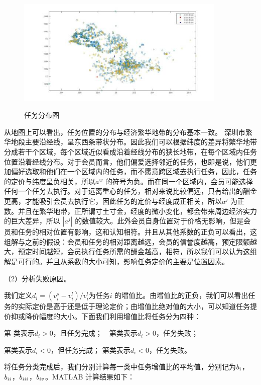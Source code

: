 \documentclass{ctexart}
\begin{document}
\begin{figure}
  \ \ \ \ \ \ \  \ \ \ \ \ \ \  \ \ \ \  \  \includegraphics[width=10cm]{5.jpg}
   \caption*{任务分布图}
  \end{figure}

 从地图上可以看出，任务位置的分布与经济繁华地带的分布基本一致。
  深圳市繁华地段主要沿经线，呈东西条带状分布。因此我们可以根据纬度的差异将繁华地带分成若干个区域，每个区域近似看成沿着经线分布的狭长地带，在每个区域内任务位置沿着经线分布。对于会员而言，他们偏爱选择邻近的任务，也即是说，他们更加偏好选取和他们在一个区域内的任务，而不愿意跨区域去执行任务，因此，任务的定价与纬度呈负相关，所以$a^{w}$ 的符号为负。而在同一个区域内，会员可能选择任何一个任务去执行。对于远离重心的任务，相对来说比较偏远，只有给出的酬金更高，才能吸引会员去执行它，因此任务的定价与经度成正相关，所以$a^{j}$ 为正数。并且在繁华地带，正所谓寸土寸金，经度的微小变化，都会带来周边经济实力的巨大差异，所以
  $|a^{j}|$ 的数值较大。此外会员自身位置对于价格无影响，但是会员和任务的相对位置有影响，这和认知相符。并且从其他系数的正负可以看出，这组解与之前的假设：会员和任务的相对距离越远，会员的信誉度越高，预定限额越大，预定时间越短，会员执行任务所需的酬金越高，相符，所以我们可以认为这组解是可行的。并且从系数的大小可知，影响任务定价的主要是位置因素。

  （2）分析失败原因。

我们定义$d_{i}=(v^{s}_{i}-v^{l}_{i})/v^{l}_{i}$为任务$i$ 的增值比。由增值比的正负，我们可以看出任务的实际定价是高于还是低于理论定价；由增值比绝对值的大小，可以知道任务提价抑或降价幅度的大小。下面我们利用增值比将任务分为四种：

第\uppercase\expandafter{} 类表示$d_{i}>0$，且任务完成；\ \ 第\uppercase\expandafter{}类表示$d_{i}>0$，任务失败；

第\uppercase\expandafter{}类表示$d_{i}<0$，但任务完成；
第\uppercase\expandafter{}类表示$d_{i}<0$，任务失败。

将任务分类完成后，我们分别计算每一类中任务增值比的平均值，分别记为$b_{\uppercase\expandafter{\romannumeral1}}$，$b_{\uppercase\expandafter{\romannumeral2}}$，$b_{\uppercase\expandafter{\romannumeral3}}$，$b_{\uppercase\expandafter{\romannumeral4}}$。MATLAB
计算结果如下：
\end{document}
